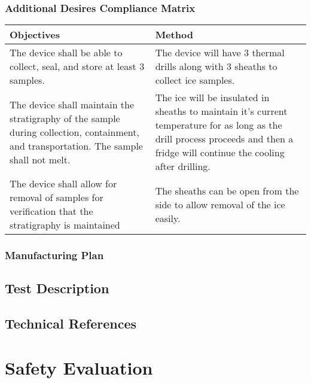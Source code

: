 \documentclass{article}
\begin{document}
\subsubsection{Additional Desires Compliance Matrix}
\begin{center}
    \begin{tabulary}{\linewidth}{|L|L|}
    \hline
    Objectives & Method \\
    \hline
    The device shall be able to collect, seal, and store at least 3 samples. &
    The device will have 3 thermal drills along with 3 sheaths to collect ice samples. \\
    \hline
    The device shall maintain the stratigraphy of the sample during collection, containment, and transportation. The sample shall not melt. &
    The ice will be insulated in sheaths to maintain it's current temperature for as long as the drill process proceeds and then a fridge will continue the cooling after drilling. \\
    \hline
    The device shall allow for removal of samples for verification that the stratigraphy is maintained &
    The sheaths can be open from the side to allow removal of the ice easily. \\
    \hline
    \end{tabulary}
\end{center}
\subsubsection{Manufacturing Plan}
\subsection{Test Description}
\subsection{Technical References}


\section{Safety Evaluation}
\end{document}

